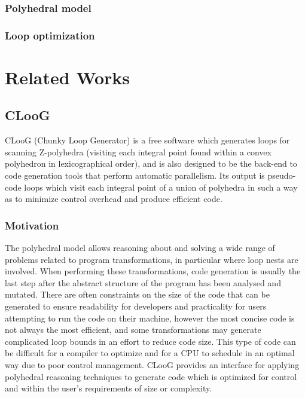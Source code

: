 \documentclass[a4paper,12pt,twoside]{report}
\begin{document}
\subsubsection{Polyhedral model}

\subsubsection{Loop optimization}

\section{Related Works}

\subsection{CLooG}
CLooG (Chunky Loop Generator) is a free software which generates loops for scanning Z-polyhedra (visiting each integral
point found within a convex polyhedron in lexicographical order), and is also designed to be
the back-end to code generation tools that perform automatic parallelism. Its output is pseudo-code loops which visit
each integral point of a union of polyhedra in such a way as to minimize control overhead and produce efficient code.

\subsubsection{Motivation}
The polyhedral model allows reasoning about and solving a wide range of problems related to program transformations,
in particular where loop nests are involved. When performing these transformations, code generation is usually the last
step after the abstract structure of the program has been analysed and mutated. There are often constraints on the size of the code
that can be generated to ensure readability for developers and practicality for users attempting to run the code on their machine,
however the most concise code is not always the most efficient, and some transformations may generate complicated loop bounds in an effort
to reduce code size. This type of code can be difficult for a compiler to optimize and for a CPU to schedule in an optimal way due to
poor control management. CLooG provides an interface for applying polyhedral reasoning techniques to generate code which is optimized for control
and within the user's requirements of size or complexity.
\end{document}

